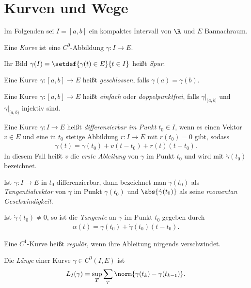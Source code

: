 \section{Kurven und Wege}

Im Folgenden sei $I=[a,b]$ ein kompaktes Intervall von $\R$ und $E$ Bannachraum.

\begin{defn}
Eine \emph{Kurve} ist eine $C^0$-Abbildung $\gamma: I\to E$.

Ihr Bild $\gamma(I) = \setdef{\gamma(t) \in E}{t\in I}$
heißt \emph{Spur}.
\end{defn}
\begin{defn}
Eine Kurve $\gamma: [a,b]\to E$ heißt \emph{geschlossen}, falls $\gamma(a) =
\gamma(b)$.
\end{defn}
\begin{defn}
Eine Kurve $\gamma: [a,b]\to E$ heißt \emph{einfach} oder
\emph{doppelpunktfrei}, falls $\gamma\big|_{(a,b]}$ und $\gamma\big|_{[a,b)}$ injektiv sind.
\end{defn}
\begin{defn}
Eine Kurve $\gamma: I\to E$ heißt \emph{differenzierbar im Punkt} $t_0\in
I$, wenn es einen Vektor $v\in E$ und eine in $t_0$ stetige Abbildung $r: I \to
E$ mit $r(t_0) = 0$ gibt, sodass
\begin{align*}
\gamma(t) = \gamma(t_0) + v(t-t_0) + r(t)(t-t_0).
\end{align*}
In diesem Fall heißt $v$ die \emph{erste Ableitung} von $\gamma$ im Punkt $t_0$
und wird mit $\dot{\gamma}(t_0)$ bezeichnet.
\end{defn}
\begin{defn}
Ist $\gamma: I\to E$ in $t_0$ differenzierbar, dann bezeichnet man
$\dot{\gamma}(t_0)$ als \emph{Tangentialvektor} von $\gamma$ im Punkt
$\gamma(t_0)$ und $\abs{\dot{\gamma}(t_0)}$ als seine \emph{momentan
Geschwindigkeit}.
\end{defn}
\begin{defn}
Ist $\dot{\gamma}(t_0)\neq0$, so ist die \emph{Tangente} an $\gamma$ im Punkt
$t_0$ gegeben durch
\begin{align*}
\alpha(t) = \gamma(t_0) + \dot{\gamma}(t_0)(t-t_0).
\end{align*}
\end{defn}
\begin{defn}
Eine $C^1$-Kurve heißt \emph{regulär}, wenn ihre Ableitung nirgends
verschwindet.
\end{defn}
\begin{defn}
Die \emph{Länge} einer Kurve $\gamma\in C^0(I,E)$ ist
\begin{align*}
L_I(\gamma) = \sup\limits_T \sum_T \norm{\gamma(t_k)-\gamma(t_{k-1})}.
\end{align*} 
\end{defn}
